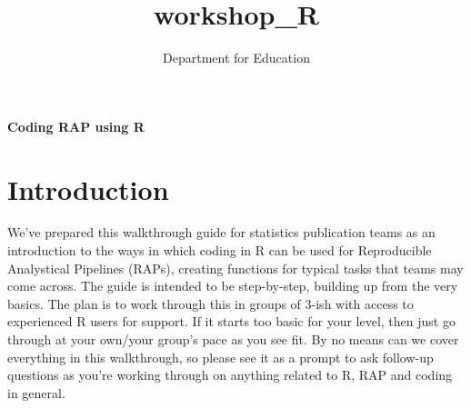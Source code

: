 \documentclass[
  12pt,
]{article}
\title{workshop\_R}
\author{Department for Education}
\date{}
\begin{document}
\maketitle


\vspace*{0.24\textheight}

\raggedright{} 

\huge{\color{dfeheadingblue}\textbf{Coding RAP using R}}
\vspace*{2\baselineskip} 

\normalsize 
 \newpage 


{
\hypersetup{linkcolor=}
\setcounter{tocdepth}{2}
\tableofcontents
}
\newpage

\hypertarget{introduction}{%
\section{Introduction}\label{introduction}}

We've prepared this walkthrough guide for statistics publication teams
as an introduction to the ways in which coding in R can be used for
Reproducible Analystical Pipelines (RAPs), creating functions for
typical tasks that teams may come across. The guide is intended to be
step-by-step, building up from the very basics. The plan is to work
through this in groups of 3-ish with access to experienced R users for
support. If it starts too basic for your level, then just go through at
your own/your group's pace as you see fit. By no means can we cover
everything in this walkthrough, so please see it as a prompt to ask
follow-up questions as you're working through on anything related to R,
RAP and coding in general.
\end{document}
